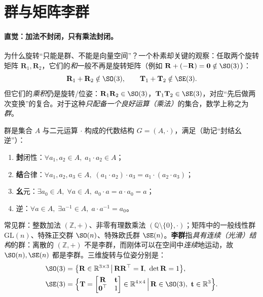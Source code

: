 \section{群与矩阵李群}
\label{sec:group}

\paragraph{直觉：加法不封闭，只有乘法封闭。}
为什么旋转“只能是群、不能是向量空间”？一个朴素却关键的观察\cite{gaoxiang2019slam14}：任取两个旋转矩阵 $\mathbf{R}_1,\mathbf{R}_2$，它们的\emph{和}一般不再是旋转矩阵（例如 $\mathbf{R}+(-\mathbf{R})=\mathbf{0}\notin\SO(3)$）：
\begin{equation}
  \mathbf{R}_1+\mathbf{R}_2\notin\SO(3),\qquad \mathbf{T}_1+\mathbf{T}_2\notin\SE(3).
  \label{eq:not-vs}
\end{equation}
但它们的\emph{乘积}仍是旋转/位姿：$\mathbf{R}_1\mathbf{R}_2\in\SO(3)$，$\mathbf{T}_1\mathbf{T}_2\in\SE(3)$，对应“先后做两次变换”的复合。对于这种\emph{只配备一个良好运算（乘法）}的集合，数学上称之为\emph{群}。

\begin{definition}[群]\label{def:group}
群是集合 $A$ 与二元运算 $\cdot$ 构成的代数结构 $G=(A,\cdot)$，满足（助记“封结幺逆”）：
\begin{enumerate}
  \item \textbf{封}闭性：$\forall a_1,a_2\in A,\; a_1\cdot a_2\in A$；
  \item \textbf{结}合律：$\forall a_1,a_2,a_3\in A,\;(a_1\cdot a_2)\cdot a_3=a_1\cdot(a_2\cdot a_3)$；
  \item \textbf{幺}元：$\exists a_0\in A,\;\forall a\in A,\; a_0\cdot a=a\cdot a_0=a$；
  \item 逆：$\forall a\in A,\;\exists a^{-1}\in A,\; a\cdot a^{-1}=a_0$。
\end{enumerate}
\end{definition}

\noindent 常见群：整数加法 $(\mathbb{Z},+)$、非零有理数乘法 $(\mathbb{Q}\setminus\{0\},\cdot)$；矩阵中的一般线性群 $\mathrm{GL}(n)$、特殊正交群 $\SO(n)$、特殊欧氏群 $\SE(n)$。\textbf{李群}指\emph{具有连续（光滑）结构}的群：离散的 $(\mathbb{Z},+)$ 不是李群，而刚体可以在空间中\emph{连续}地运动，故 $\SO(n),\SE(n)$ 都是李群。三维旋转与位姿分别是：
\begin{align}
  \SO(3) &= \big\{\mathbf{R}\in\mathbb{R}^{3\times3}\,\big|\,\mathbf{R}\mathbf{R}^\top=\mathbf{I},\ \det\mathbf{R}=1\big\},\label{eq:so3}\\
  \SE(3) &= \Big\{\mathbf{T}=\begin{bmatrix}\mathbf{R}&\mathbf{t}\\\mathbf{0}^\top&1\end{bmatrix}\in\mathbb{R}^{4\times4}\,\Big|\,\mathbf{R}\in\SO(3),\ \mathbf{t}\in\mathbb{R}^3\Big\}.\label{eq:se3}
\end{align}

